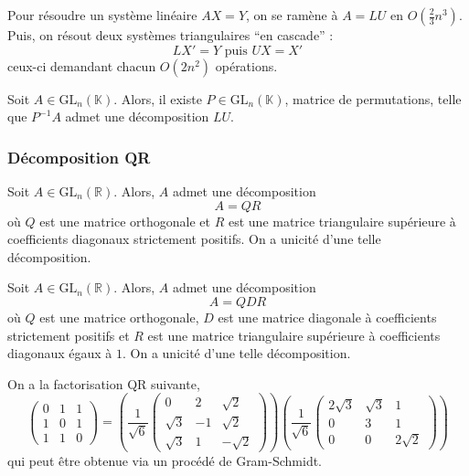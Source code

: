 	\begin{remark}
		Pour résoudre un système linéaire $AX = Y$, on se ramène à $A = LU$ en $O \left( \frac{2}{3}n^3 \right)$. Puis, on résout deux systèmes triangulaires ``en cascade'' :
		\[ LX' = Y \text{ puis } UX = X' \]
		ceux-ci demandant chacun $O(2n^2)$ opérations.
	\end{remark}
	
	\begin{theorem}
		Soit $A \in \mathrm{GL}_n(\mathbb{K})$. Alors, il existe $P \in \mathrm{GL}_n(\mathbb{K})$, matrice de permutations, telle que $P^{-1}A$ admet une décomposition $LU$.
	\end{theorem}
	
	\subsubsection{Décomposition QR}
	
	
	\begin{theorem}[Décomposition QR]
		Soit $A \in \mathrm{GL}_n(\mathbb{R})$. Alors, $A$ admet une décomposition
		\[ A = QR \]
		où $Q$ est une matrice orthogonale et $R$ est une matrice triangulaire supérieure à coefficients diagonaux strictement positifs. On a unicité d'une telle décomposition.
	\end{theorem}
	
	\begin{corollary}
		Soit $A \in \mathrm{GL}_n(\mathbb{R})$. Alors, $A$ admet une décomposition
		\[ A = QDR \]
		où $Q$ est une matrice orthogonale, $D$ est une matrice diagonale à coefficients strictement positifs et $R$ est une matrice triangulaire supérieure à coefficients diagonaux égaux à $1$. On a unicité d'une telle décomposition.
	\end{corollary}
	
	
	\begin{example}
		On a la factorisation QR suivante,
		\[ \begin{pmatrix} 0 & 1 & 1 \\ 1 & 0 & 1 \\ 1 & 1 & 0 \end{pmatrix} = \left( \frac{1}{\sqrt{6}} \begin{pmatrix} 0 & 2 & \sqrt{2} \\ \sqrt{3} & -1 & \sqrt{2} \\ \sqrt{3} & 1 & -\sqrt{2} \end{pmatrix} \right) \left( \frac{1}{\sqrt{6}} \begin{pmatrix} 2\sqrt{3} & \sqrt{3} & 1 \\ 0 & 3 & 1 \\ 0 & 0 & 2\sqrt{2} \end{pmatrix} \right) \]
		qui peut être obtenue via un procédé de Gram-Schmidt.
	\end{example}
	
